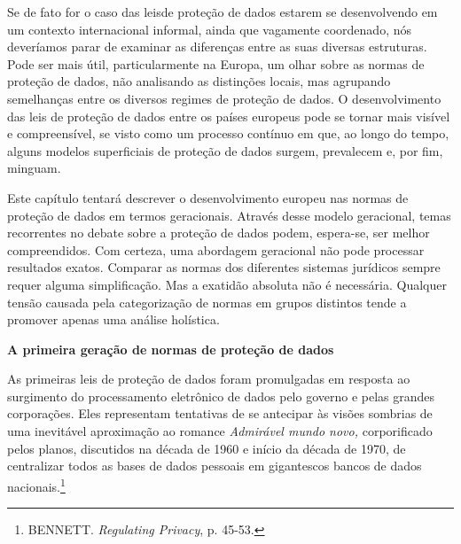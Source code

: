 Se de fato for o caso das leisde proteção de dados estarem se
desenvolvendo em um contexto internacional informal, ainda que vagamente
coordenado, nós deveríamos parar de examinar as diferenças entre as suas
diversas estruturas. Pode ser mais útil, particularmente na Europa, um
olhar sobre as normas de proteção de dados, não analisando as distinções
locais, mas agrupando semelhanças entre os diversos regimes de proteção
de dados. O desenvolvimento das leis de proteção de dados entre os
países europeus pode se tornar mais visível e compreensível, se visto
como um processo contínuo em que, ao longo do tempo, alguns modelos
superficiais de proteção de dados surgem, prevalecem e, por fim,
minguam.

Este capítulo tentará descrever o desenvolvimento europeu nas normas de
proteção de dados em termos geracionais. Através desse modelo
geracional, temas recorrentes no debate sobre a proteção de dados podem,
espera-se, ser melhor compreendidos. Com certeza, uma abordagem
geracional não pode processar resultados exatos. Comparar as normas dos
diferentes sistemas jurídicos sempre requer alguma simplificação. Mas a
exatidão absoluta não é necessária. Qualquer tensão causada pela
categorização de normas em grupos distintos tende a promover apenas uma
análise holística.

\textbf{A primeira geração de normas de proteção de dados}

As primeiras leis de proteção de dados foram promulgadas em resposta ao
surgimento do processamento eletrônico de dados pelo governo e pelas
grandes corporações. Eles representam tentativas de se antecipar às
visões sombrias de uma inevitável aproximação ao romance \emph{Admirável
mundo novo,} corporificado pelos planos, discutidos na década de 1960 e
início da década de 1970, de centralizar todos as bases de dados
pessoais em gigantescos bancos de dados nacionais.\footnote{BENNETT.
  \emph{Regulating Privacy}, p. 45-53.}

